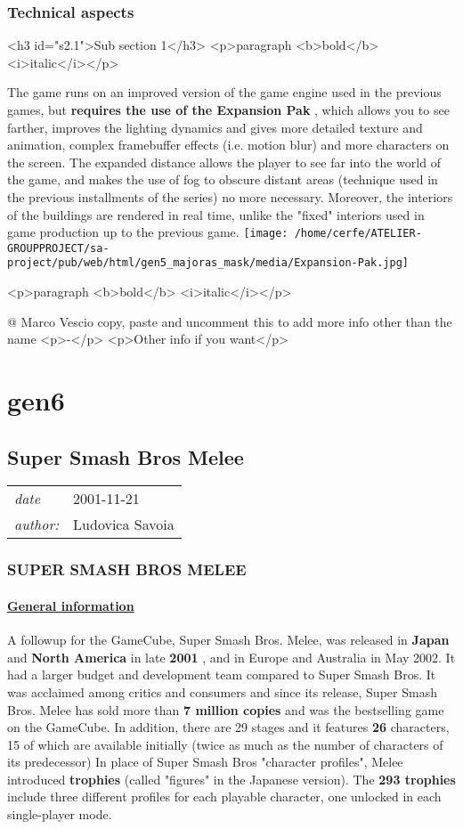 \documentclass[a4paper,10pt]{book}
\newcommand{\pageHeader}[4]{
    \section{#1}
    \vspace{-0.3cm}
    \begin{table}[h!]
     \begin{tabular}{ll}
        \hline
        \textit{date} & #2 \\
        \textit{author: } & #3\\
        \hline
     \end{tabular}
    \end{table}
    \vspace{-0.3cm}
}
\begin{document}
 \subsection{Technical aspects }
 <h3 id="s2.1">Sub section 1</h3>
        <p>paragraph <b>bold</b> <i>italic</i></p> 
 
          The game runs on an improved version of the game engine used in the previous games, but  \textbf{requires the use of the Expansion Pak } , which allows you to see farther, improves the lighting dynamics
          and gives more detailed texture and animation, complex framebuffer effects (i.e. motion blur) and more characters on the screen. The expanded distance allows the player to see far into the world of the
          game, and makes the use of fog to obscure distant areas (technique used in the previous installments of the series) no more necessary. Moreover, the interiors of the buildings are rendered in real time, unlike the
          "fixed" interiors used in game production up to the previous game. 
 \texttt{[image: /home/cerfe/ATELIER-GROUPPROJECT/sa-project/pub/web/html/gen5\_majoras\_mask/media/Expansion-Pak.jpg]}
 
 <p>paragraph <b>bold</b> <i>italic</i></p> 
 
 @ Marco Vescio 
  copy, paste and uncomment this to add more info other than the name
            <p>-</p>
            <p>Other info if you want</p>
           
 
 \newpage\chapter{gen6}\newpage\pageHeader{Super Smash Bros Melee}{2001-11-21}{Ludovica Savoia}{One of the best Super Mario Games}
 \subsection{SUPER SMASH BROS MELEE }
 \subsubsection{\underline{General information }}
 
          A followup for the GameCube, Super Smash Bros. Melee, was released in  \textbf{Japan }  and  \textbf{North America }  in late  \textbf{2001 } , and in
          Europe and Australia in May 2002. It had a larger budget and development team compared to Super Smash Bros. It was acclaimed among critics and consumers and since its release, Super Smash Bros. Melee
          has sold more than  \textbf{7 million copies }  and was the bestselling game on the GameCube. In addition, there are 29 stages and it features  \textbf{26 }  characters, 15 of which are available initially (twice as much as the number of characters of its
          predecessor)  
          In place of Super Smash Bros "character profiles", Melee introduced  \textbf{trophies }  (called "figures" in the Japanese version).
          The  \textbf{293 trophies }  include three different profiles for each playable character, one unlocked in each single-player mode.
         
\end{document}
